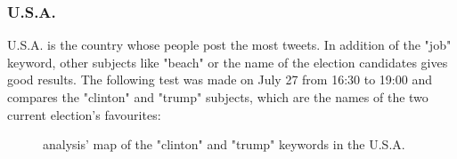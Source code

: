 \documentclass[a4paper,11pt]{report}
\begin{document}
\subsubsection{U.S.A.}
U.S.A. is the country whose people post the most tweets. In addition of the "job" keyword, other subjects like "beach" or the name of the election candidates gives good results. The following test was made on July 27 from 16:30 to 19:00 and compares the "clinton" and "trump" subjects, which are the names of the two current election's favourites:\\
\begin{figure}[H]
\vspace{-5pt}
\begin{center}
\vspace{-20pt}
\caption{analysis' map of the "clinton" and "trump" keywords in the U.S.A.}
\end{center}
\end{figure}
\vspace{-10pt}
\end{document}
